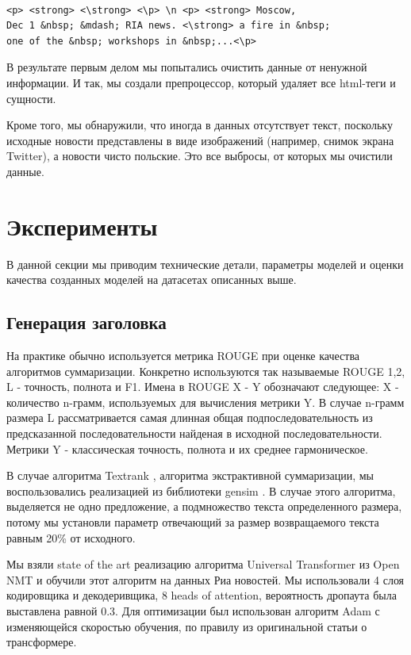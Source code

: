 \documentclass[14pt]{matmex-diploma-custom}
\begin{document}
\begin{verbatim}

<p> <strong> <\strong> <\p> \n <p> <strong> Moscow,
Dec 1 &nbsp; &mdash; RIA news. <\strong> a fire in &nbsp;
one of the &nbsp; workshops in &nbsp;...<\p>
\end{verbatim}

В результате первым делом мы попытались очистить данные от ненужной информации. И так, мы создали препроцессор, который удаляет все html-теги и сущности.

Кроме того, мы обнаружили, что иногда в данных отсутствует текст, поскольку исходные новости представлены в виде изображений (например, снимок экрана Twitter), а новости чисто польские. Это все выбросы, от которых мы очистили данные.


\section{Эксперименты}
В данной секции мы приводим технические детали, параметры моделей и оценки качества созданных моделей на датасетах описанных выше.

\subsection{Генерация заголовка}
На практике обычно используется метрика ROUGE \cite{Lin:2004} при оценке качества алгоритмов суммаризации. Конкретно используются так называемые ROUGE 1,2, L - точность, полнота и F1. Имена в ROUGE X - Y обозначают следующее: X - количество n-грамм, используемых для вычисления метрики Y. В случае n-грамм размера L рассматривается самая длинная общая подпоследовательность из предсказанной последовательности найденая в исходной последовательности. Метрики Y - классическая точность, полнота и их среднее гармоническое.

В случае алгоритма Textrank \cite{DBLP:journals/corr/BarriosLAW16}, алгоритма экстрактивной суммаризации, мы воспользовались реализацией из библиотеки gensim \cite{rehurek_lrec}. В случае этого алгоритма, выделяется не одно предложение, а подмножество текста определенного размера, потому мы установли параметр отвечающий за размер возвращаемого текста равным 20\% от исходного.

Мы взяли state of the art реализацию алгоритма Universal Transformer из Open NMT \cite{2017opennmt} и обучили этот алгоритм на данных Риа новостей. Мы использовали 4 слоя кодировщика и декодеривщика, 8 heads of attention, вероятность дропаута была выставлена равной 0.3. Для оптимизации был использован алгоритм Adam с изменяющейся скоростью обучения, по правилу из оригинальной статьи о трансформере.
\end{document}
